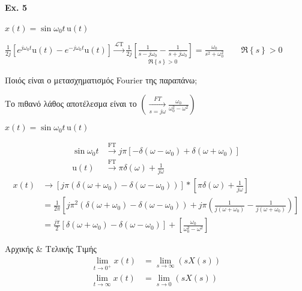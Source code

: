     \paragraph{Ex. 5}
    \( x(t)=\sin\omega_0 t\, \mathrm u(t) \)
    
    \( \displaystyle
    \frac{1}{2j}\left[
    e^{j\omega_0 t}\mathrm u(t)-e^{-j\omega_0 t}\mathrm u(t)
    \right] \xrightarrow{\mathscr L \mathrm T}
    \frac{1}{2j}\underset{\Re\left\lbrace s \right\rbrace>0}{
        \left[ \frac{1}{s-j\omega_0} - \frac{1}{s+j\omega_0} \right]
    } = \frac{\omega_0}{s^2+\omega_0^2}
     \qquad \Re \left\lbrace s \right\rbrace > 0
     \)
     
    Ποιός είναι ο μετασχηματισμός Fourier της παραπάνω;
    
    Το πιθανό λάθος αποτέλεσμα είναι το \( 
    \displaystyle \left(
    \xrightarrow[s=j\omega ]{FT} \frac{\omega_0}{\omega_0^2-\omega^2}
    \right)
     \)
     
    \( x(t) = \sin\omega_0t\, \mathrm u(t) \)
    
    \begin{align*}
    \sin\omega_0 t &\xrightarrow{\mathrm{FT}} j\pi\left[
    -\delta(\omega-\omega_0)+\delta(\omega +\omega_0)
    \right] \\
    \mathrm u(t) &\xrightarrow{\mathrm{FT}} \pi\delta(\omega )+\frac{1}{j\omega }
    \end{align*}
    \begin{align*}
    x(t) &\to \left[
    j\pi\left(\delta(\omega +\omega_0)-\delta(\omega -\omega_0) \right)
    \right] * \left[
    \pi\delta(\omega )+\frac{1}{j\omega }
    \right] \\
    &= \frac{1}{2\pi}\left[
    j\pi^2\left(
    \delta(\omega+\omega_0)-\delta(\omega-\omega_0)
    \right) +j\pi\left(
    \frac{1}{j(\omega+\omega_0)}-\frac{1}{j(\omega+\omega_0)}
    \right)    \right]
    \\ &= \frac{j\pi}{2}\left[
    \delta(\omega +\omega_0)-\delta(\omega-\omega_0)\right]+\left[
    \frac{\omega_0}{\omega_0^2-\omega^2}
    \right] 
    \end{align*}
    
    \begin{theorem*}[title=Θεωρήματα Αρχικής \& Τελικής Τιμής,width=.5\textwidth]%
        {Αρχικής \& Τελικής Τιμής}
    \begin{align*}
    \lim_{t\to 0^+} x(t) &= \lim_{s\to \infty} \left( sX(s) \right) \\
    \lim_{t\to \infty} x(t) &= \lim_{s\to 0} \left( sX(s) \right)
    \end{align*}
    \end{theorem*}
    
